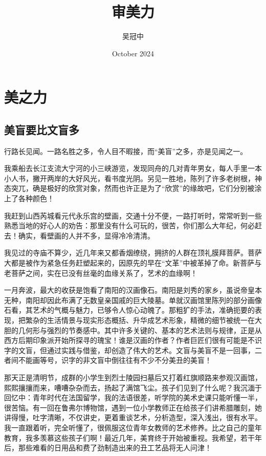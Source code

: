 \documentclass{article}
\title{审美力}
\author{吴冠中}
\date{October 2024}
\begin{document}
\tableofcontents

\maketitle

\section{美之力}
\subsection{美盲要比文盲多}

行路长见闻。一路名胜之多，令人目不暇接，而“美盲”之多，亦是见闻之一。

我乘船去长江支流大宁河的小三峡游览，发现同舟的几对青年男女，每人手里一本小人书，撇开两岸的大好风光，看书度光阴。另见一胜地，陈列了许多老树根，神态突兀，确是极好的欣赏对象，然而也许正是为了“欣赏”的缘故吧，它们分别被涂上了各种颜色！

我赶到山西芮城看元代永乐宫的壁画，交通十分不便，一路打听时，常常听到一些熟悉当地的好心人的劝告：那里没有什么可玩的，很苦，你们那么大年纪，何必赶去！确实，看壁画的人并不多，显得冷冷清清。

我见过的寺庙不算少，近几年来又都香烟缭绕，拥挤的人群在顶礼膜拜菩萨。菩萨大都是被作为紧急任务赶塑起来的，因原先的早在“文革”中被革掉了命。新菩萨与老菩萨之间，实在已没有丝毫的血缘关系了，艺术的血缘啊！

一月奔波，最大的收获是饱看了南阳的汉画像石。南阳是刘秀的家乡，虽说帝皇本无种，南阳却因此布满了无数皇亲国戚的巨大陵墓。单就汉画馆里陈列的部分画像石看，其艺术的气概与魅力，已够令人惊心动魄了。那粗犷的手法，准确扼要的表现，把繁杂的生活情景与现实形态概括、升华成艺术形象，精微的细节被统一在大胆的几何形与强烈的节奏感中。其中许多关键的、基本的艺术法则与规律，正是从西方后期印象派开始所探寻的瑰宝！谁是汉画的作者？作者巨匠们很有可能是不识字的文盲，但通过实践与借鉴，却创造了伟大的艺术。文盲与美盲不是一回事，二者间不能画等号，识字的非文盲中倒往往有不少不分美丑的美盲！

那天正是清明节，成群的小学生到烈士陵园扫墓后又打着红旗顺路来参观汉画馆，熙熙攘攘而来，嘈嘈杂杂而去，扬起了满馆飞尘。孩子们见到了什么呢？我沉湎于回忆中：青年时代在法国留学，我的法语很差，听学院的美术史课只能听懂一半，很苦恼。有一回在鲁弗尔博物馆，遇到一位小学教师正在给孩子们讲希腊雕刻，她讲得慢，吐字清晰，不仅讲史，更着重谈艺术，分析造型，深入浅出，很有水平。我一直跟着听，完全听懂了，很佩服这位青年女教师的艺术修养。比之自己的童年教育，我多羡慕这些孩子们啊！最近几年，美育终于开始被重视。我希望，若干年后，那些难看的日用品和费了劲制造出来的丑工艺品将无人问津！
\end{document}
